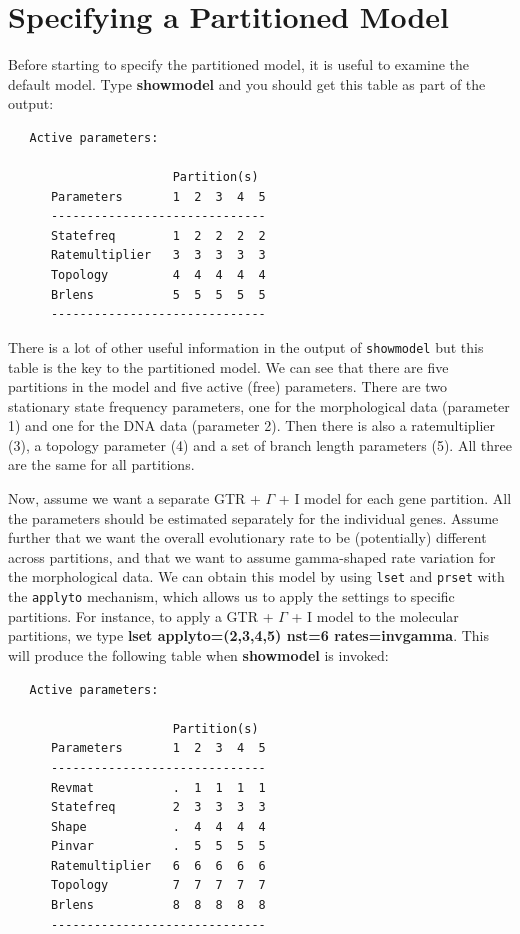\documentclass[12pt]{book}
\begin{document}
\section{Specifying a Partitioned Model}

Before starting to specify the partitioned model, it is useful to examine the default model. Type 
\textbf{showmodel} and you should get this table as part of the output:

\begin{singlespacing}
\small
\begin{verbatim}
   Active parameters:
 
                       Partition(s)
      Parameters       1  2  3  4  5
      ------------------------------
      Statefreq        1  2  2  2  2
      Ratemultiplier   3  3  3  3  3
      Topology         4  4  4  4  4
      Brlens           5  5  5  5  5
      ------------------------------
\end{verbatim}
\normalsize
\end{singlespacing}

There is a lot of other useful information in the output of \texttt{showmodel} but this table is the key to 
the partitioned model. We can see that there are five partitions in the model and five active (free) 
parameters. There are two stationary state frequency parameters, one for the morphological data (parameter 
1) and one for the DNA data (parameter 2). Then there is also a ratemultiplier (3), a topology parameter (4) 
and a set of branch length parameters (5). All three are the same for all partitions.

Now, assume we want a separate GTR + $\Gamma$ + I model for each gene partition. All the parameters should 
be estimated separately for the individual genes. Assume further that we want the overall evolutionary rate 
to be (potentially) different across partitions, and that we want to assume gamma-shaped rate variation for 
the morphological data. We can obtain this model by using \texttt{lset} and \texttt{prset} with the 
\texttt{applyto} mechanism, which allows us to apply the settings to specific partitions. For instance, to 
apply a GTR + $\Gamma$ + I model to the molecular partitions, we type \textbf{lset applyto=(2,3,4,5) nst=6 
rates=invgamma}. This will produce the following table when \textbf{showmodel} is invoked:

\begin{singlespacing}
\small
\begin{verbatim}
   Active parameters:
 
                       Partition(s)
      Parameters       1  2  3  4  5
      ------------------------------
      Revmat           .  1  1  1  1
      Statefreq        2  3  3  3  3
      Shape            .  4  4  4  4
      Pinvar           .  5  5  5  5
      Ratemultiplier   6  6  6  6  6
      Topology         7  7  7  7  7
      Brlens           8  8  8  8  8
      ------------------------------
\end{verbatim}
\normalsize
\end{singlespacing}
\end{document}
